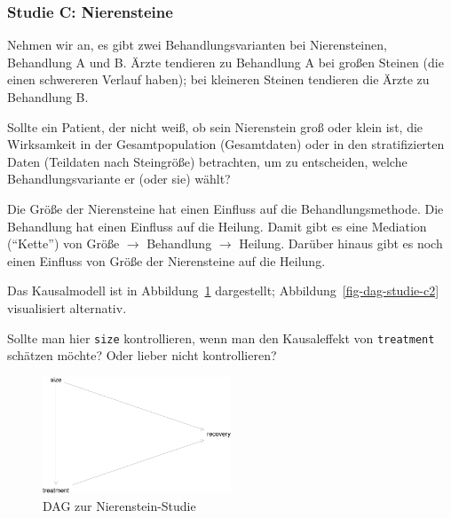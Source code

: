 \documentclass[
  a4paper,
  DIV=11]{scrreprt}
\theoremstyle{definition}
\theoremstyle{remark}
\begin{document}
\hypertarget{studie-c-nierensteine}{%
\subsubsection{Studie C: Nierensteine}\label{studie-c-nierensteine}}

Nehmen wir an, es gibt zwei Behandlungsvarianten bei Nierensteinen,
Behandlung A und B. Ärzte tendieren zu Behandlung A bei großen Steinen
(die einen schwereren Verlauf haben); bei kleineren Steinen tendieren
die Ärzte zu Behandlung B.

Sollte ein Patient, der nicht weiß, ob sein Nierenstein groß oder klein
ist, die Wirksamkeit in der Gesamtpopulation (Gesamtdaten) oder in den
stratifizierten Daten (Teildaten nach Steingröße) betrachten, um zu
entscheiden, welche Behandlungsvariante er (oder sie) wählt?

Die Größe der Nierensteine hat einen Einfluss auf die
Behandlungsmethode. Die Behandlung hat einen Einfluss auf die Heilung.
Damit gibt es eine Mediation (``Kette'') von Größe \(\rightarrow\)
Behandlung \(\rightarrow\) Heilung. Darüber hinaus gibt es noch einen
Einfluss von Größe der Nierensteine auf die Heilung.

Das Kausalmodell ist in Abbildung~\ref{fig-dag-studie-c} dargestellt;
Abbildung~\ref{fig-dag-studie-c2} visualisiert alternativ.

Sollte man hier \texttt{size} kontrollieren, wenn man den Kausaleffekt
von \texttt{treatment} schätzen möchte? Oder lieber nicht kontrollieren?

\begin{figure}

{\centering \includegraphics[width=0.5\textwidth,height=\textheight]{./kausal_files/figure-pdf/fig-dag-studie-c-1.pdf}

}

\caption{\label{fig-dag-studie-c}DAG zur Nierenstein-Studie}

\end{figure}
\end{document}
